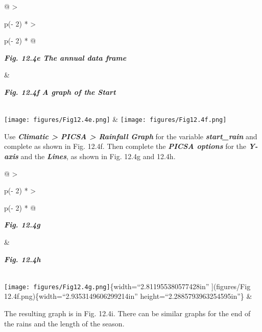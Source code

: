 \documentclass[
  letterpaper,
  DIV=11,
  numbers=noendperiod]{scrreprt}
\begin{document}
\begin{longtable}[]{@{}
  >{\raggedright\arraybackslash}p{(\columnwidth - 2\tabcolsep) * }
  >{\raggedright\arraybackslash}p{(\columnwidth - 2\tabcolsep) * }@{}}
\toprule\noalign{}
\begin{minipage}[b]{\linewidth}\raggedright
\textbf{\emph{Fig. 12.4e The annual data frame}}
\end{minipage} & \begin{minipage}[b]{\linewidth}\raggedright
\textbf{\emph{Fig. 12.4f A graph of the Start}}
\end{minipage} \\
\midrule\noalign{}
\endhead
\bottomrule\noalign{}
\endlastfoot
\texttt{[image: figures/Fig12.4e.png]}
&
\texttt{[image: figures/Fig12.4f.png]} \\
\end{longtable}

Use \textbf{\emph{Climatic \textgreater{} PICSA \textgreater{} Rainfall
Graph}} for the variable \textbf{\emph{start\_rain}} and complete as
shown in Fig. 12.4f. Then complete the \textbf{\emph{PICSA options}} for
the \textbf{\emph{Y-axis}} and the \textbf{\emph{Lines}}, as shown in
Fig. 12.4g and 12.4h.

\begin{longtable}[]{@{}
  >{\raggedright\arraybackslash}p{(\columnwidth - 2\tabcolsep) * }
  >{\raggedright\arraybackslash}p{(\columnwidth - 2\tabcolsep) * }@{}}
\toprule\noalign{}
\begin{minipage}[b]{\linewidth}\raggedright
\textbf{\emph{Fig. 12.4g}}
\end{minipage} & \begin{minipage}[b]{\linewidth}\raggedright
\textbf{\emph{Fig. 12.4h}}
\end{minipage} \\
\midrule\noalign{}
\endhead
\bottomrule\noalign{}
\endlastfoot
\texttt{[image: figures/Fig12.4g.png]}\{width=``2.811955380577428in''
{]}(figures/Fig 12.4f.png)\{width=``2.9353149606299214in''
height=``2.2885793963254595in''\} & \\
\end{longtable}

The resulting graph is in Fig. 12.4i. There can be similar graphs for
the end of the rains and the length of the season.
\end{document}
